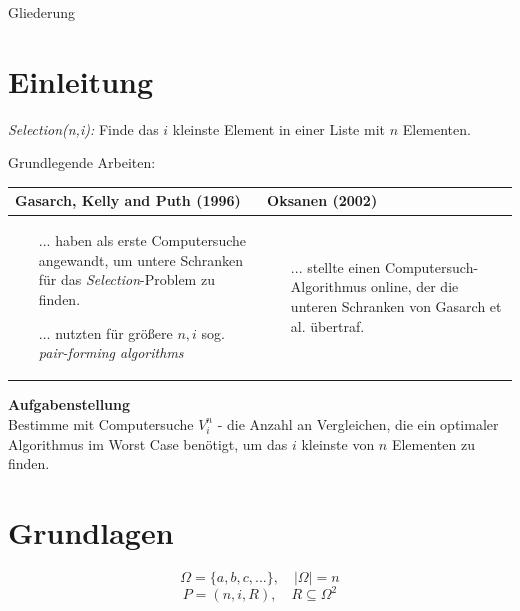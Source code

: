 
\begin{frame}{Gliederung}
  \tableofcontents[hideallsubsections]
\end{frame}


\section{Einleitung}
\begin{frame}{\insertsection}
  \textit{Selection(n,i):} Finde das $i$ kleinste Element in einer Liste mit $n$ Elementen.

  \vspace{5mm}
  Grundlegende Arbeiten:

  \vspace{2mm}
  \begin{tabular}{|p{6cm}|p{6cm}|}
    \hline
    Gasarch, Kelly and Puth (1996)                                                                                        & Oksanen (2002) \\
    \hline
    \raggedright \begin{itemize}
                   \item [...]haben als erste Computersuche angewandt, um untere Schranken für das \textit{Selection}-Problem zu finden.
                   \item [...]nutzten für größere $n,i$ sog. \textit{pair-forming algorithms}
                 \end{itemize} &
    \begin{itemize}
      \item[...] stellte einen Computersuch-Algorithmus online, der die unteren Schranken von Gasarch et al. übertraf.
    \end{itemize}
  \end{tabular}
\end{frame}

\begin{frame}{\insertsection}
  \textbf{Aufgabenstellung} \\
  \vspace{5mm}
  Bestimme mit Computersuche $V_i^n$ - die Anzahl an Vergleichen, die ein optimaler Algorithmus im Worst Case benötigt, um das $i$ kleinste von $n$ Elementen zu finden.

\end{frame}


\section{Grundlagen}
\sectionframe{\insertsection}
\begin{frame}{\insertsection}
  $$ \Omega = \{ a,b,c,...\}, \quad |\Omega| = n $$
  $$P = (n,i,R), \quad R \subseteq \Omega^2$$
\end{frame}

